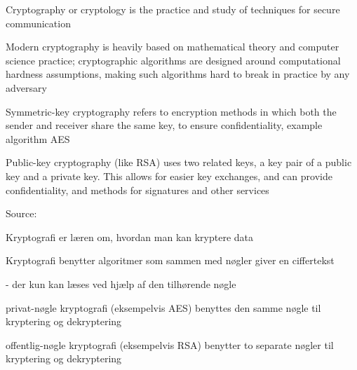 \documentclass[Screen16to9,17pt]{foils}
\begin{document}

\begin{list1}
\item Cryptography or cryptology is the practice and study of techniques for secure communication
\item Modern cryptography is heavily based on mathematical theory and computer science practice; cryptographic algorithms are designed around computational hardness assumptions, making such algorithms hard to break in practice by any adversary
\item Symmetric-key cryptography refers to encryption methods in which both the sender and receiver share the same key, to ensure confidentiality, example algorithm AES
\item Public-key cryptography (like RSA) uses two related keys, a key pair of a public key and a private key. This allows for easier key exchanges, and can provide confidentiality, and methods for signatures and other services
\end{list1}

Source: 




\begin{list1}
\item Kryptografi er læren om, hvordan man kan kryptere data
\item Kryptografi benytter algoritmer som sammen med nøgler giver en
  ciffertekst
\item  - der kun kan læses ved hjælp af den tilhørende nøgle
\end{list1}



\begin{list1}
\item privat-nøgle kryptografi (eksempelvis AES) benyttes den samme
  nøgle til kryptering og dekryptering
\item offentlig-nøgle kryptografi (eksempelvis RSA) benytter to
  separate nøgler til kryptering og dekryptering
\end{list1}


\end{document}
